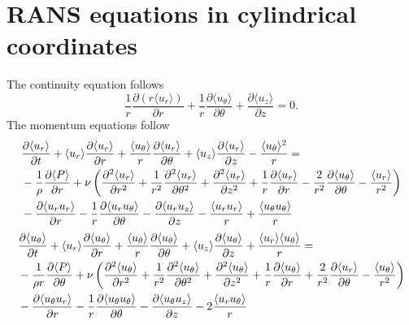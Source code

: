 \documentclass[oneside,a4paper,11pt]{report}
\begin{document}
 \chapter{RANS equations in cylindrical coordinates}
%
The continuity equation follows
\begin{equation}
\frac{1}{r} \frac{\partial \left ( r \langle u_r \rangle \right )}{\partial r} + \frac{1}{r} \frac{\partial \langle u_\theta \rangle}{\partial \theta} + \frac{\partial \langle u_z \rangle}{\partial z} = 0.
\end{equation} 
The momentum equations follow
\begin{align}
&\frac{\partial \langle u_r \rangle}{\partial t} + \langle u_r \rangle \frac{\partial \langle u_r \rangle}{\partial r} + \frac{\langle u_\theta \rangle}{r} \frac{\partial \langle u_r \rangle}{\partial \theta} + \langle u_z \rangle \frac{\partial \langle u_r \rangle}{\partial z} - \frac{\langle u_\theta \rangle^2}{r} = \nonumber \\ 
&-\frac{1}{\rho} \frac{\partial \langle P \rangle}{\partial r} + \nu \left ( \frac{\partial^2 \langle u_r \rangle}{\partial r^2} + \frac{1}{r^2} \frac{\partial^2 \langle u_r \rangle}{\partial \theta^2} + \frac{\partial^2 \langle u_r \rangle}{\partial z^2} + \frac{1}{r} \frac{\partial \langle u_r \rangle}{\partial r} - \frac{2}{r^2} \frac{\partial \langle u_\theta \rangle }{\partial \theta} - \frac{\langle u_r \rangle}{r^2} \right ) \nonumber \\
&- \frac{\partial \langle u_ru_r \rangle}{\partial r} - \frac{1}{r} \frac{\partial \langle u_r u_\theta \rangle}{\partial \theta} - \frac{\partial \langle u_r u_z \rangle}{\partial z} - \frac{\langle u_ru_r \rangle}{r} + \frac{\langle u_\theta u_\theta \rangle}{r}
\end{align} 
\begin{align}
&\frac{\partial \langle u_\theta \rangle}{\partial t} + \langle u_r \rangle \frac{\partial \langle u_\theta \rangle}{\partial r} + \frac{\langle u_\theta \rangle}{r} \frac{\partial \langle u_\theta \rangle}{\partial \theta} + \langle u_z \rangle \frac{\partial \langle u_\theta \rangle}{\partial z} + \frac{\langle u_r \rangle \langle u_\theta\rangle}{r} = \nonumber \\ 
&-\frac{1}{\rho r} \frac{\partial \langle P \rangle}{\partial \theta} + \nu \left ( \frac{\partial^2 \langle u_\theta \rangle}{\partial r^2} + \frac{1}{r^2} \frac{\partial^2 \langle u_\theta \rangle}{\partial \theta^2} + \frac{\partial^2 \langle u_\theta \rangle}{\partial z^2} + \frac{1}{r} \frac{\partial \langle u_\theta \rangle}{\partial r} + \frac{2}{r^2} \frac{\partial \langle u_r \rangle }{\partial \theta} - \frac{\langle u_\theta \rangle}{r^2} \right ) \nonumber \\
&- \frac{\partial \langle u_\theta u_r \rangle}{\partial r} - \frac{1}{r} \frac{\partial \langle u_\theta u_\theta \rangle}{\partial \theta} - \frac{\partial \langle u_\theta u_z \rangle}{\partial z} - 2\frac{\langle u_ru_\theta \rangle}{r}
\end{align} 
\end{document}

